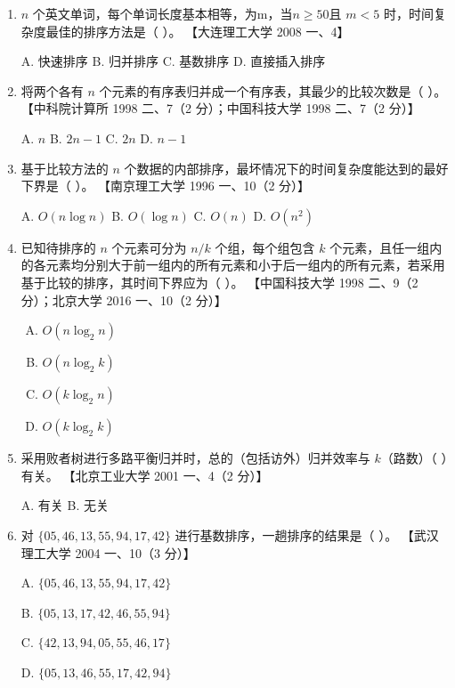 \documentclass[lang=cn,newtx,10pt,scheme=chinese]{../../elegantbook}
\begin{document}
\begin{enumerate}
    \item $n$ 个英文单词，每个单词长度基本相等，为m，当$n ≥ 50$且 $m < 5$ 时，时间复杂度最佳的排序方法是（ ）。  
    【大连理工大学 2008 一、4】  

    A. 快速排序 \quad B. 归并排序 \quad C. 基数排序 \quad D. 直接插入排序  

    \item 将两个各有 $n$ 个元素的有序表归并成一个有序表，其最少的比较次数是（ ）。  
    【中科院计算所 1998 二、7（2 分）；中国科技大学 1998 二、7（2 分）】  

    A. $n$ \quad B. $2n-1$ \quad C. $2n$ \quad D. $n-1$  

    \item 基于比较方法的 $n$ 个数据的内部排序，最坏情况下的时间复杂度能达到的最好下界是（ ）。  
    【南京理工大学 1996 一、10（2 分）】  

    A. $O(n \log n)$ \quad B. $O(\log n)$ \quad C. $O(n)$ \quad D. $O(n^2)$  

    \item 已知待排序的 $n$ 个元素可分为 $n / k$ 个组，每个组包含 $k$ 个元素，且任一组内的各元素均分别大于前一组内的所有元素和小于后一组内的所有元素，若采用基于比较的排序，其时间下界应为（ ）。  
    【中国科技大学 1998 二、9（2 分）；北京大学 2016 一、10（2 分）】

    \begin{enumerate}[A.]
        \item $O(n \log_2 n)$
        \item $O(n \log_2 k)$
        \item $O(k \log_2 n)$
        \item $O(k \log_2 k)$
    \end{enumerate}
    \item 采用败者树进行多路平衡归并时，总的（包括访外）归并效率与 $k$（路数）（ ）有关。  
    【北京工业大学 2001 一、4（2 分）】  

    A. 有关 \quad B. 无关  

    \item 对 $\{05, 46, 13, 55, 94, 17, 42\}$ 进行基数排序，一趟排序的结果是（ ）。  
    【武汉理工大学 2004 一、10（3 分）】  

    A. $\{05, 46, 13, 55, 94, 17, 42\}$  

    B. $\{05, 13, 17, 42, 46, 55, 94\}$  

    C. $\{42, 13, 94, 05, 55, 46, 17\}$  

    D. $\{05, 13, 46, 55, 17, 42, 94\}$  


\end{enumerate}
\end{document}
